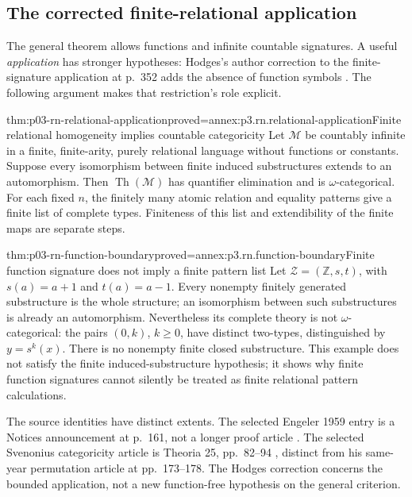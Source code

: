 \subsection{The corrected finite-relational application}
\label{sec:p03-rn-finite-relational}

The general theorem allows functions and infinite countable
signatures. A useful \emph{application} has stronger hypotheses:
Hodges's author correction to the finite-signature application
at p.~352 adds the absence of function symbols
\cite[p.~3, correction to p.~352]{Hodges1993Corrigenda2011}.
The following argument makes that restriction's role explicit.

\begin{hbtheorem}{thm:p03-rn-relational-application}{proved=annex:p3.rn.relational-application}{Finite relational homogeneity implies countable categoricity}
Let \(\mathcal M\) be countably infinite in a finite,
finite-arity, purely relational language without functions
or constants. Suppose every isomorphism between finite
induced substructures extends to an automorphism.
Then \(\operatorname{Th}(\mathcal M)\) has quantifier
elimination and is \(\omega\)-categorical.
For each fixed \(n\), the finitely many atomic relation
and equality patterns give a finite list of complete types.
Finiteness of this list and extendibility of the finite maps
are separate steps.
\end{hbtheorem}

\begin{hbtheorem}{thm:p03-rn-function-boundary}{proved=annex:p3.rn.function-boundary}{Finite function signature does not imply a finite pattern list}
Let \(\mathcal Z=(\mathbb Z,s,t)\), with
\(s(a)=a+1\) and \(t(a)=a-1\).
Every nonempty finitely generated substructure is the whole
structure; an isomorphism between such substructures is
already an automorphism.
Nevertheless its complete theory is not
\(\omega\)-categorical: the pairs \((0,k)\), \(k\geq0\),
have distinct two-types, distinguished by \(y=s^k(x)\).
There is no nonempty finite closed substructure.
This example does not satisfy the finite induced-substructure
hypothesis; it shows why finite function signatures cannot
silently be treated as finite relational pattern calculations.
\end{hbtheorem}

The source identities have distinct extents. The selected
Engeler 1959 entry is a Notices announcement at p.~161,
not a longer proof article \cite{Engeler1959}.
The selected Svenonius categoricity article is Theoria 25,
pp.~82--94 \cite{Svenonius1959}, distinct from his same-year
permutation article at pp.~173--178.
The Hodges correction concerns the bounded application,
not a new function-free hypothesis on the general criterion.
